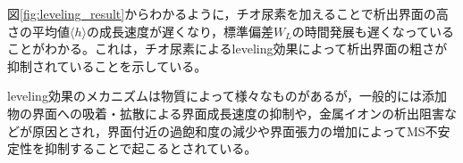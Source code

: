 \documentclass[autodetect-engine,dvi=dvipdfmx,a4paper,ja=standard,oneside,openany,11pt]{bxjsbook}
\begin{document}
図\ref{fig:leveling_result}からわかるように，チオ尿素を加えることで析出界面の高さの平均値$\langle h\rangle$の成長速度が遅くなり，標準偏差$W_L$の時間発展も遅くなっていることがわかる。これは，チオ尿素によるleveling効果によって析出界面の粗さが抑制されていることを示している。

leveling効果のメカニズムは物質によって様々なものがある\cite{めっき添加剤の作用機構と表面形状制御}が，一般的には添加物の界面への吸着・拡散による界面成長速度の抑制や，金属イオンの析出阻害などが原因とされ\cite{oniciu1991some}，界面付近の過飽和度の減少や界面張力の増加によってMS不安定性を抑制することで起こるとされている。

\ifdraft{
  
  
}{}
\end{document}
